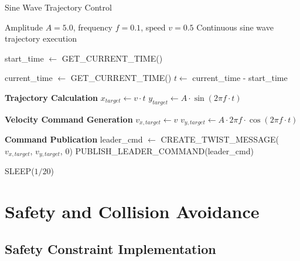\documentclass[11pt,a4paper]{article}
\begin{document}
\begin{algorithm}[H]
\caption{Sine Wave Trajectory Control}
\label{alg:sine_wave}
\begin{algorithmic}[1]
\Require Amplitude $A = 5.0$, frequency $f = 0.1$, speed $v = 0.5$
\Ensure Continuous sine wave trajectory execution

\State start\_time $\leftarrow$ GET\_CURRENT\_TIME()

    \State current\_time $\leftarrow$ GET\_CURRENT\_TIME()
    \State $t \leftarrow$ current\_time - start\_time
    
    \State \textbf{Trajectory Calculation}
    \State $x_{target} \leftarrow v \cdot t$
    \State $y_{target} \leftarrow A \cdot \sin(2\pi f \cdot t)$
    
    \State \textbf{Velocity Command Generation}
    \State $v_{x,target} \leftarrow v$
    \State $v_{y,target} \leftarrow A \cdot 2\pi f \cdot \cos(2\pi f \cdot t)$
    
    \State \textbf{Command Publication}
    \State leader\_cmd $\leftarrow$ CREATE\_TWIST\_MESSAGE($v_{x,target}$, $v_{y,target}$, 0)
    \State PUBLISH\_LEADER\_COMMAND(leader\_cmd)
    
    \State SLEEP($1/20$) 
\EndWhile
\end{algorithmic}
\end{algorithm}

\section{Safety and Collision Avoidance}

\subsection{Safety Constraint Implementation}
\end{document}
